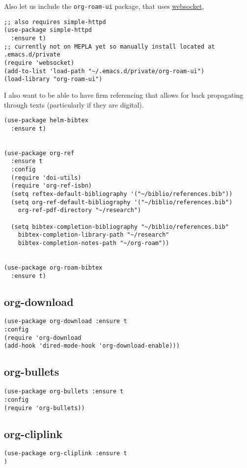 Also let us include the \texttt{org-roam-ui} package, that uses \href{./websocket.org}{websocket},
\begin{verbatim}
;; also requires simple-httpd
(use-package simple-httpd
  :ensure t)
;; currently not on MEPLA yet so manually install located at .emacs.d/private
(require 'websocket)
(add-to-list 'load-path "~/.emacs.d/private/org-roam-ui")
(load-library "org-roam-ui")
\end{verbatim}

I also want to be able to have firm referencing that allows for back propagating through texts (particularly if they are digital).
\begin{verbatim}
(use-package helm-bibtex
  :ensure t)


(use-package org-ref
  :ensure t
  :config
  (require 'doi-utils)
  (require 'org-ref-isbn)
  (setq reftex-default-bibliography '("~/biblio/references.bib"))
  (setq org-ref-default-bibliography '("~/biblio/references.bib")
	org-ref-pdf-directory "~/research")

  (setq bibtex-completion-bibliography "~/biblio/references.bib"
	bibtex-completion-library-path "~/research"
	bibtex-completion-notes-path "~/org-roam"))


(use-package org-roam-bibtex
  :ensure t)
\end{verbatim}

\subsection{org-download}
\label{sec:orgd33fe2c}
\begin{verbatim}
(use-package org-download :ensure t
:config
(require 'org-download
(add-hook 'dired-mode-hook 'org-download-enable)))
\end{verbatim}

\subsection{org-bullets}
\label{sec:org227758c}
\begin{verbatim}
(use-package org-bullets :ensure t
:config
(require 'org-bullets))
\end{verbatim}
\subsection{org-cliplink}
\label{sec:orgb16cc0b}
\begin{verbatim}
(use-package org-cliplink :ensure t
)
\end{verbatim}

